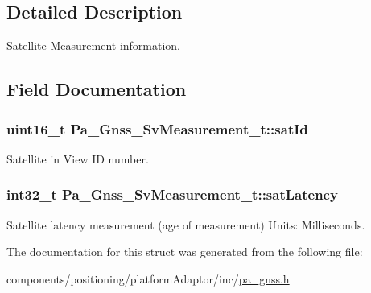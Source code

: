 \subsection{Detailed Description}
Satellite Measurement information. 

\subsection{Field Documentation}
\subsubsection[{\texorpdfstring{sat\+Id}{satId}}]{\setlength{\rightskip}{0pt plus 5cm}uint16\+\_\+t Pa\+\_\+\+Gnss\+\_\+\+Sv\+Measurement\+\_\+t\+::sat\+Id}\hypertarget{struct_pa___gnss___sv_measurement__t_a3e21c003064c204efcf3efc2a3238f02}{}\label{struct_pa___gnss___sv_measurement__t_a3e21c003064c204efcf3efc2a3238f02}


Satellite in View ID number. 

\subsubsection[{\texorpdfstring{sat\+Latency}{satLatency}}]{\setlength{\rightskip}{0pt plus 5cm}int32\+\_\+t Pa\+\_\+\+Gnss\+\_\+\+Sv\+Measurement\+\_\+t\+::sat\+Latency}\hypertarget{struct_pa___gnss___sv_measurement__t_ac2bc09238dff84fe6f7fe8aa51fc25a7}{}\label{struct_pa___gnss___sv_measurement__t_ac2bc09238dff84fe6f7fe8aa51fc25a7}
Satellite latency measurement (age of measurement) Units\+: Milliseconds. 

The documentation for this struct was generated from the following file\+:\begin{DoxyCompactItemize}
\item 
components/positioning/platform\+Adaptor/inc/\hyperlink{pa__gnss_8h}{pa\+\_\+gnss.\+h}\end{DoxyCompactItemize}

